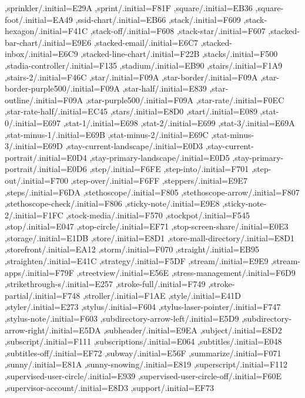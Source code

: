 { ,sprinkler/.initial=E29A
 ,sprint/.initial=F81F
 ,square/.initial=EB36
 ,square-foot/.initial=EA49
 ,ssid-chart/.initial=EB66
 ,stack/.initial=F609
 ,stack-hexagon/.initial=F41C
 ,stack-off/.initial=F608
 ,stack-star/.initial=F607
 ,stacked-bar-chart/.initial=E9E6
 ,stacked-email/.initial=E6C7
 ,stacked-inbox/.initial=E6C9
 ,stacked-line-chart/.initial=F22B
 ,stacks/.initial=F500
 ,stadia-controller/.initial=F135
 ,stadium/.initial=EB90
 ,stairs/.initial=F1A9
 ,stairs-2/.initial=F46C
 ,star/.initial=F09A
 ,star-border/.initial=F09A
 ,star-border-purple500/.initial=F09A
 ,star-half/.initial=E839
 ,star-outline/.initial=F09A
 ,star-purple500/.initial=F09A
 ,star-rate/.initial=F0EC
 ,star-rate-half/.initial=EC45
 ,stars/.initial=E8D0
 ,start/.initial=E089
 ,stat-0/.initial=E697
 ,stat-1/.initial=E698
 ,stat-2/.initial=E699
 ,stat-3/.initial=E69A
 ,stat-minus-1/.initial=E69B
 ,stat-minus-2/.initial=E69C
 ,stat-minus-3/.initial=E69D
 ,stay-current-landscape/.initial=E0D3
 ,stay-current-portrait/.initial=E0D4
 ,stay-primary-landscape/.initial=E0D5
 ,stay-primary-portrait/.initial=E0D6
 ,step/.initial=F6FE
 ,step-into/.initial=F701
 ,step-out/.initial=F700
 ,step-over/.initial=F6FF
 ,steppers/.initial=E9E7
 ,steps/.initial=F6DA
 ,stethoscope/.initial=F805
 ,stethoscope-arrow/.initial=F807
 ,stethoscope-check/.initial=F806
 ,sticky-note/.initial=E9E8
 ,sticky-note-2/.initial=F1FC
 ,stock-media/.initial=F570
 ,stockpot/.initial=F545
 ,stop/.initial=E047
 ,stop-circle/.initial=EF71
 ,stop-screen-share/.initial=E0E3
 ,storage/.initial=E1DB
 ,store/.initial=E8D1
 ,store-mall-directory/.initial=E8D1
 ,storefront/.initial=EA12
 ,storm/.initial=F070
 ,straight/.initial=EB95
 ,straighten/.initial=E41C
 ,strategy/.initial=F5DF
 ,stream/.initial=E9E9
 ,stream-apps/.initial=F79F
 ,streetview/.initial=E56E
 ,stress-management/.initial=F6D9
 ,strikethrough-s/.initial=E257
 ,stroke-full/.initial=F749
 ,stroke-partial/.initial=F748
 ,stroller/.initial=F1AE
 ,style/.initial=E41D
 ,styler/.initial=E273
 ,stylus/.initial=F604
 ,stylus-laser-pointer/.initial=F747
 ,stylus-note/.initial=F603
 ,subdirectory-arrow-left/.initial=E5D9
 ,subdirectory-arrow-right/.initial=E5DA
 ,subheader/.initial=E9EA
 ,subject/.initial=E8D2
 ,subscript/.initial=F111
 ,subscriptions/.initial=E064
 ,subtitles/.initial=E048
 ,subtitles-off/.initial=EF72
 ,subway/.initial=E56F
 ,summarize/.initial=F071
 ,sunny/.initial=E81A
 ,sunny-snowing/.initial=E819
 ,superscript/.initial=F112
 ,supervised-user-circle/.initial=E939
 ,supervised-user-circle-off/.initial=F60E
 ,supervisor-account/.initial=E8D3
 ,support/.initial=EF73
}
